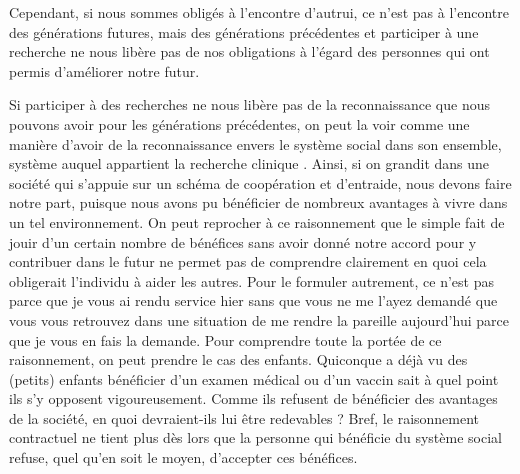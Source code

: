 \documentclass[
  12pt,
]{book}
\begin{document}
Cependant, si nous sommes obligés à l'encontre d'autrui, ce n'est pas à l'encontre des générations futures, mais des générations précédentes et participer à une recherche ne nous libère pas de nos obligations à l'égard des personnes qui ont permis d'améliorer notre futur.

Si participer à des recherches ne nous libère pas de la reconnaissance que nous pouvons avoir pour les générations précédentes, on peut la voir comme une manière d'avoir de la reconnaissance envers le système social dans son ensemble, système auquel appartient la recherche clinique \citep{Brock1992}. Ainsi, si on grandit dans une société qui s'appuie sur un schéma de coopération et d'entraide, nous devons faire notre part, puisque nous avons pu bénéficier de nombreux avantages à vivre dans un tel environnement. On peut reprocher à ce raisonnement que le simple fait de jouir d'un certain nombre de bénéfices sans avoir donné notre accord pour y contribuer dans le futur ne permet pas de comprendre clairement en quoi cela obligerait l'individu à aider les autres. Pour le formuler autrement, ce n'est pas parce que je vous ai rendu service hier sans que vous ne me l'ayez demandé que vous vous retrouvez dans une situation de me rendre la pareille aujourd'hui parce que je vous en fais la demande. Pour comprendre toute la portée de ce raisonnement, on peut prendre le cas des enfants. Quiconque a déjà vu des (petits) enfants bénéficier d'un examen médical ou d'un vaccin sait à quel point ils s'y opposent vigoureusement. Comme ils refusent de bénéficier des avantages de la société, en quoi devraient-ils lui être redevables ? Bref, le raisonnement contractuel ne tient plus dès lors que la personne qui bénéficie du système social refuse, quel qu'en soit le moyen, d'accepter ces bénéfices.
\end{document}
